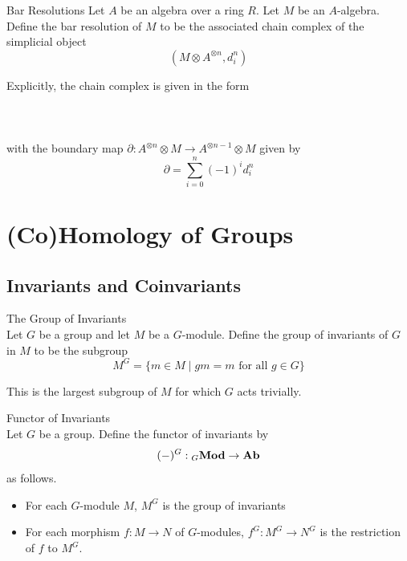 \documentclass[a4paper]{article}
\begin{document}
\begin{defn}{Bar Resolutions}{} Let $A$ be an algebra over a ring $R$. Let $M$ be an $A$-algebra. Define the bar resolution of $M$ to be the associated chain complex of the simplicial object $$(M\otimes A^{\otimes n},d_i^n)$$ 
\end{defn}

Explicitly, the chain complex is given in the form \\~\\
\\~\\
with the boundary map $\partial:A^{\otimes n}\otimes M\to A^{\otimes n-1}\otimes M$ given by $$\partial=\sum_{i=0}^n(-1)^id_i^n$$


\pagebreak
\section{(Co)Homology of Groups}
\subsection{Invariants and Coinvariants}
\begin{defn}{The Group of Invariants}{}\\
Let $G$ be a group and let $M$ be a $G$-module. Define the group of invariants of $G$ in $M$ to be the subgroup $$M^G=\{m\in M\;|\;gm=m\text{ for all }g\in G\}$$
\end{defn}

This is the largest subgroup of $M$ for which $G$ acts trivially. 

\begin{defn}{Functor of Invariants}{}\\
Let $G$ be a group. Define the functor of invariants by $$(-)^G:{_G}\bold{Mod}\to\bold{Ab}$$ as follows. 
\begin{itemize}
\item For each $G$-module $M$, $M^G$ is the group of invariants
\item For each morphism $f:M\to N$ of $G$-modules, $f^G:M^G\to N^G$ is the restriction of $f$ to $M^G$. 
\end{itemize}
\end{defn}
\end{document}

